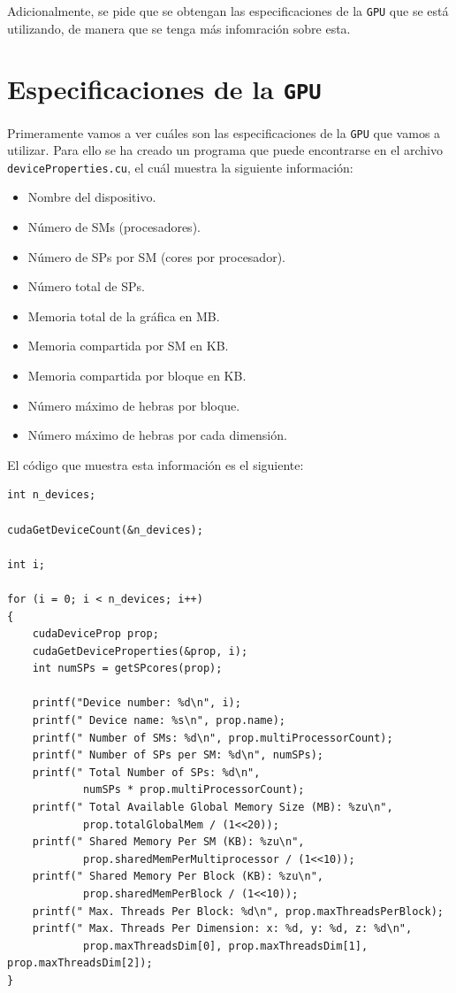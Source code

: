 \documentclass[11pt,a4paper]{article}
\begin{document}
Adicionalmente, se pide que se obtengan las especificaciones de la \texttt{GPU} que se está
utilizando, de manera que se tenga más infomración sobre esta.

\section{Especificaciones de la \texttt{GPU}}

Primeramente vamos a ver cuáles son las especificaciones de la \texttt{GPU} que vamos a
utilizar. Para ello se ha creado un programa que puede encontrarse en el archivo
\texttt{deviceProperties.cu}, el cuál muestra la siguiente información:

\begin{itemize}
  \item Nombre del dispositivo.
  \item Número de SMs (procesadores).
  \item Número de SPs por SM (cores por procesador).
  \item Número total de SPs.
  \item Memoria total de la gráfica en MB.
  \item Memoria compartida por SM en KB.
  \item Memoria compartida por bloque en KB.
  \item Número máximo de hebras por bloque.
  \item Número máximo de hebras por cada dimensión.
\end{itemize}

El código que muestra esta información es el siguiente:

\begin{lstlisting}
int n_devices;

cudaGetDeviceCount(&n_devices);

int i;

for (i = 0; i < n_devices; i++)
{
	cudaDeviceProp prop;
	cudaGetDeviceProperties(&prop, i);
	int numSPs = getSPcores(prop);

	printf("Device number: %d\n", i);
	printf(" Device name: %s\n", prop.name);
	printf(" Number of SMs: %d\n", prop.multiProcessorCount);
	printf(" Number of SPs per SM: %d\n", numSPs);
	printf(" Total Number of SPs: %d\n",
			numSPs * prop.multiProcessorCount);
	printf(" Total Available Global Memory Size (MB): %zu\n",
			prop.totalGlobalMem / (1<<20));
	printf(" Shared Memory Per SM (KB): %zu\n",
			prop.sharedMemPerMultiprocessor / (1<<10));
	printf(" Shared Memory Per Block (KB): %zu\n",
			prop.sharedMemPerBlock / (1<<10));
	printf(" Max. Threads Per Block: %d\n", prop.maxThreadsPerBlock);
	printf(" Max. Threads Per Dimension: x: %d, y: %d, z: %d\n",
			prop.maxThreadsDim[0], prop.maxThreadsDim[1], prop.maxThreadsDim[2]);
}
\end{lstlisting}
\end{document}
